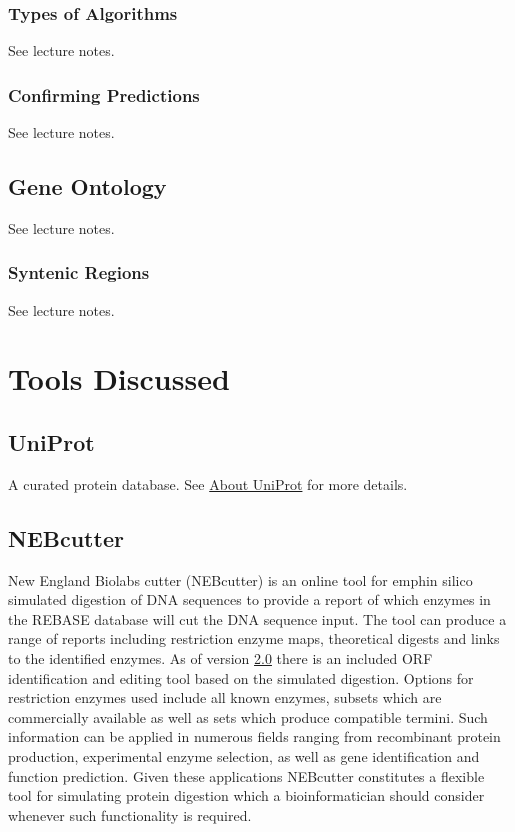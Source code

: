         \subsubsection{Types of Algorithms}

        See lecture notes.\autocite{T6}

        \subsubsection{Confirming Predictions}

        See lecture notes.\autocite{T6}

    \subsection{Gene Ontology}

    See lecture notes.\autocite{T6}

        \subsubsection{Syntenic Regions}

        See lecture notes.\autocite{T6}

\section{Tools Discussed}

    \subsection{UniProt}

    A curated protein database. See \href{https://www.uniprot.org/help/about}{About UniProt} for more details.

    \subsection{NEBcutter}

    New England Biolabs cutter (NEBcutter) is an online tool for emph{in silico} simulated digestion of DNA sequences to provide a report of which enzymes in the REBASE database will cut the DNA sequence input.\autocite{B12} The tool can produce a range of reports including restriction enzyme maps, theoretical digests and links to the identified enzymes. As of version \href{http://www.labtools.us/nebcutter-v2-0/}{2.0} there is an included ORF identification and editing tool based on the simulated digestion.\autocite{B12} Options for restriction enzymes used include all known enzymes, subsets which are commercially available as well as sets which produce compatible termini.\autocite{B12} Such information can be applied in numerous fields ranging from recombinant protein production, experimental enzyme selection, as well as gene identification and function prediction. Given these applications NEBcutter constitutes a flexible tool for simulating protein digestion which a bioinformatician should consider whenever such functionality is required.
    
